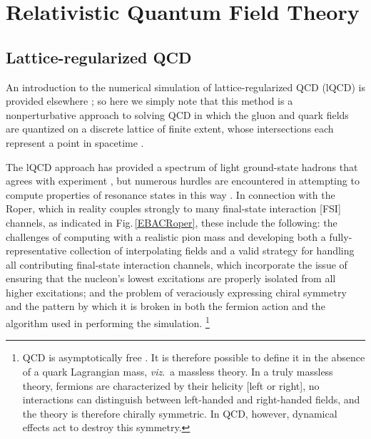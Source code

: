 \setcounter{equation}{0}
\setcounter{figure}{0}
%
\section{Relativistic Quantum Field Theory}
\label{TheorySection}
%
\subsection{Lattice-regularized QCD}
\label{sec:lQCD}
%
An introduction to the numerical simulation of lattice-regularized QCD (lQCD) is provided elsewhere \cite{Gattringer:2010zz}; so here we simply note that this method is a nonperturbative approach to solving QCD in which the gluon and quark fields are quantized on a discrete lattice of finite extent, whose intersections each represent a point in spacetime \cite{Wilson:1974sk}.

The lQCD approach has provided a spectrum of light ground-state hadrons that agrees with experiment \cite{Durr:2008zz}, but numerous hurdles are encountered in attempting to compute properties of resonance states in this way \cite{Liu:2016rwa, Briceno:2017max}.
In connection with the Roper, which in reality couples strongly to many final-state interaction [FSI] channels, as indicated in Fig.\,\ref{EBACRoper}, these include the following:
%
the challenges of computing with a realistic pion mass and developing both a fully-representative collection of interpolating fields and a valid strategy for handling all contributing final-state interaction channels, which incorporate the issue of ensuring that the nucleon's lowest excitations are properly isolated from all higher excitations; and the problem of veraciously expressing chiral symmetry and the pattern by which it is broken in both the fermion action and the algorithm used in performing the simulation.%
\footnote{QCD is asymptotically free \cite{Politzer:2005kc, Gross:2005kv, Wilczek:2005az}.  It is therefore possible to define it in the absence of a quark Lagrangian mass, \emph{viz}.\ a massless theory.  In a truly massless theory, fermions are characterized by their helicity [left or right], no interactions can distinguish between left-handed and right-handed fields, and the theory is therefore chirally symmetric.  In QCD, however, dynamical effects act to destroy this symmetry.}

